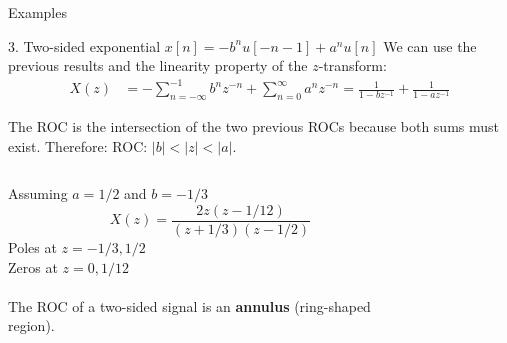 \documentclass[10pt]{beamer}
\begin{document}
\begin{frame}{Examples}

\begin{block}{3. Two-sided exponential $x[n] = -b^nu[-n-1] + a^nu[n]$}
	We can use the previous results and the linearity property of the $z$-transform:
	\vspace{-0.25cm}
	\begin{align*} 
	X(z) &= -\sum_{n=-\infty}^{-1} b^nz^{-n} + \sum_{n=0}^\infty a^nz^{-n} = \frac{1}{1-bz^{-1}} + \frac{1}{1-az^{-1}} 
	\end{align*}
	
	The ROC is the intersection of the two previous ROCs because both sums must exist. Therefore:
	ROC: $|b| < |z| < |a|$.

	\begin{columns}
		\begin{column}{0.5\textwidth}
			Assuming $a = 1/2$ and $b=-1/3$
			\begin{equation*} 
			X(z) = \frac{2z(z-1/12)}{(z+1/3)(z-1/2)}
			\end{equation*}
			Poles at $z = -1/3, 1/2$\\
			Zeros at $z = 0, 1/12$
			~\\
			~\\
			The ROC of a two-sided signal is an \textbf{annulus} (ring-shaped region).
			
		\end{column}
		\begin{column}{0.5\textwidth}  %
			\begin{figure}
				\centering
				\resizebox{0.95\linewidth}{!}{}
				\label{fig:left_sided_exp}
			\end{figure}
		\end{column}
	\end{columns}
	
\end{block}
\end{frame}
\end{document}
